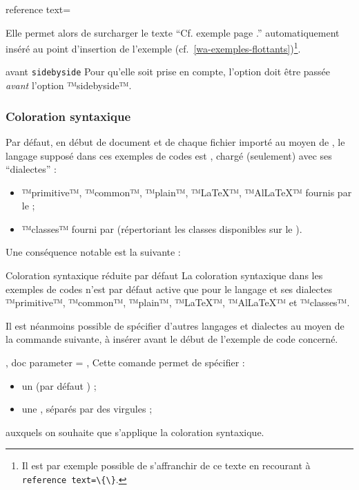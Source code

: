 \documentclass{letgut}
\begin{document}
\begin{itemize}
\begin{docKey}{reference text}{=}{}
\begin{itemize}
    \end{itemize}
    Elle permet alors de surcharger le texte \enquote{Cf. exemple  page
      .} automatiquement inséré au point d'insertion de l'exemple
    (cf.~\vref{wa-exemples-flottants})\footnote{Il est par exemple possible de
      s'affranchir de ce texte en recourant à \lstinline+reference text=\{\}+.}.
    \begin{dbwarning}{ avant \lstinline+sidebyside+}{}
      Pour qu'elle soit prise en compte, l'option  doit
      être passée \emph{avant} l'option ™sidebyside™.
    \end{dbwarning}
  \end{docKey}
\end{itemize}

\subsubsection{Coloration syntaxique}
\label{sec:coloration}

Par défaut, en début de document et de chaque fichier importé au moyen de
, le langage supposé dans ces exemples de codes est
, chargé (seulement) avec ses \enquote{dialectes} :
\begin{itemize}
\item ™primitive™, ™common™, ™plain™, ™LaTeX™, ™AlLaTeX™ fournis par le
   ;
\item ™classes™ fourni par  (répertoriant les classes disponibles
  sur le \ctan{}).
\end{itemize}
Une conséquence notable est la suivante :
\begin{dbwarning}{Coloration syntaxique réduite par défaut}{}
  La coloration syntaxique dans les exemples de codes n'est par défaut active
  que pour le langage  et ses dialectes ™primitive™, ™common™,
  ™plain™, ™LaTeX™, ™AlLaTeX™ et ™classes™.
\end{dbwarning}

Il est néanmoins possible de spécifier d'autres langages et dialectes au moyen
de la commande  suivante, à insérer avant le début de l'exemple
de code concerné.

\begin{docCommands}[
doc name = syntaxhl,
doc parameter = \marg{liste de dialectes},
]
{
  { },
  { doc parameter =  },
}
Cette comande permet de spécifier :
\begin{itemize}
\item un  (par défaut ) ;
\item une , séparés par des virgules ;
\end{itemize}
auxquels on souhaite que s'applique la coloration syntaxique.
\end{docCommands}
\end{document}
